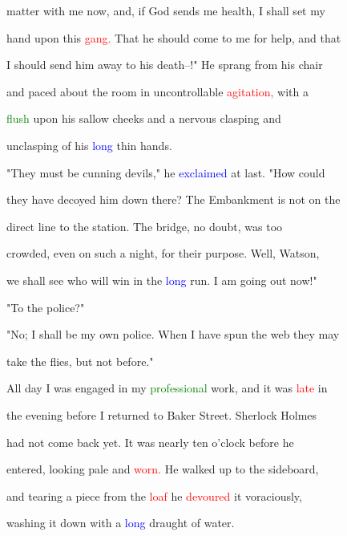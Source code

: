 matter with me now, and, if \textcolor{BurntOrange}{God} sends me health, I shall set my

 hand upon this \textcolor{red}{gang.} That he should come to me for help, and that

 I should send him away to his \textcolor{BurntOrange}{death--!"} He sprang from his chair

 and paced about the room in \textcolor{BurntOrange}{uncontrollable} \textcolor{red}{agitation,} with a

 \textcolor{green}{flush} upon his sallow cheeks and a \textcolor{BurntOrange}{nervous} clasping and

 unclasping of his \textcolor{blue}{long} thin hands.



 "They must be \textcolor{BurntOrange}{cunning} \textcolor{BurntOrange}{devils,"} he \textcolor{blue}{exclaimed} at last. "How could

 they have decoyed him down there? The Embankment is not on the

 direct line to the station. The bridge, no \textcolor{BurntOrange}{doubt,} was too

 crowded, even on such a night, for their purpose. Well, Watson,

 we shall see who will win in the \textcolor{blue}{long} run. I am going out now!"



 "To the \textcolor{BurntOrange}{police?"}



 "No; I shall be my own \textcolor{BurntOrange}{police.} When I have spun the web they may

 take the flies, but not before."



 All day I was engaged in my \textcolor{green}{professional} work, and it was \textcolor{red}{late} in

 the evening before I returned to Baker Street. Sherlock Holmes

 had not come back yet. It was nearly ten o'clock before he

 entered, looking pale and \textcolor{red}{worn.} He walked up to the sideboard,

 and tearing a piece from the \textcolor{red}{loaf} he \textcolor{red}{devoured} it voraciously,

 washing it down with a \textcolor{blue}{long} draught of water.



